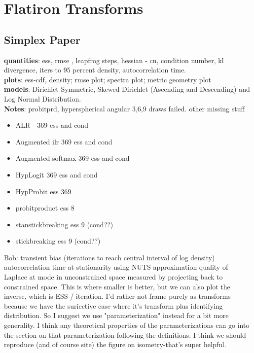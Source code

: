 \section{Flatiron Transforms}
\label{sec:transforms}
\subsection{Simplex Paper}

\textbf{quantities}: ess, rmse , leapfrog steps, hessian - cn, condition number, kl divergence, iters to 95 percent density, autocorrelation time.\\

\textbf{plots}: ess-cdf, density; rmse plot; spectra plot; metric geometry plot\\

\textbf{models}: Dirichlet Symmetric, Skewed Dirichlet (Ascending and Descending) and Log Normal Distribution.\\

\textbf{Notes}: probitprd, hyperspherical angular 3,6,9 draws failed. other missing stuff
\begin{itemize}
\item ALR - 369 ess and cond
\item Augmented ilr 369 ess and cond
\item Augmented softmax 369 ess and cond
\item HypLogit 369 ess and cond
\item HypProbit ess 369

\item probitproduct ess 8
\item stanstickbreaking ess 9 (cond??)
\item stickbreaking ess 9 (cond??)
\end{itemize}


Bob: transient bias (iterations to reach central interval of log density)
autocorrelation time at stationarity using NUTS
approximation quality of Laplace at mode in unconstrained space measured by projecting back to constrained space. This is where smaller is better, but we can also plot the inverse, which is ESS / iteration. I'd rather not frame purely as transforms because we have the suriective case where it's transform plus identifying distribution. So I suggest we use "parameterization" instead for a bit more generality. I think any theoretical properties of the parameterizations can go into the section on that parameterization following the definitions. I think we should reproduce (and of course site) the figure on isometry-that's super helpful.